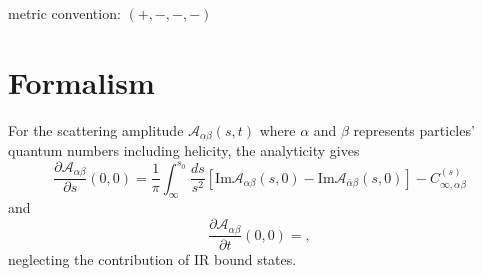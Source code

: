 \documentclass[11pt]{article}
\theoremstyle{definition}
\theoremstyle{remark}
\begin{document}
	metric convention: $(+,-,-,-)$
	\section{Formalism}
	For the scattering amplitude $\mathcal{A}_{\alpha\beta}(s,t)$ where $\alpha$ and $\beta$ represents particles' quantum numbers including helicity, the analyticity gives
	\[\frac{\partial\mathcal{A}_{\alpha\beta}}{\partial s}(0,0)=\frac{1}{\pi}\int_{\infty}^{s_{0}}\frac{ds}{s^{2}}[\mathrm{Im}\mathcal{A}_{\alpha\beta}(s,0)-\mathrm{Im}\mathcal{A}_{\bar{\alpha}\beta}(s,0)]-C^{(s)}_{\infty,\alpha\beta}\]
	and
	\[\frac{\partial\mathcal{A}_{\alpha\beta}}{\partial t}(0,0)=,\]
	neglecting the contribution of IR bound states.
\end{document}
